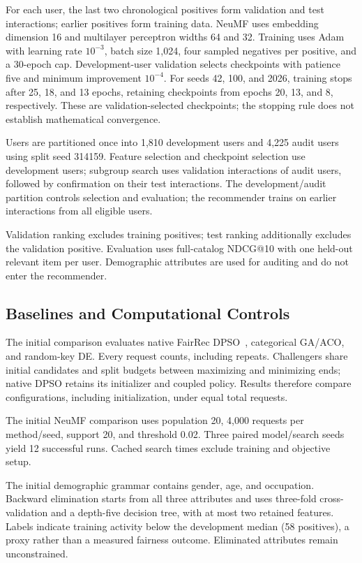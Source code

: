 \documentclass[sigconf,nonacm]{acmart}
\begin{document}
For each user, the last two chronological positives form validation and test interactions; earlier positives form training data. NeuMF uses embedding dimension 16 and multilayer perceptron widths 64 and 32. Training uses Adam with learning rate $10^{-3}$, batch size 1,024, four sampled negatives per positive, and a 30-epoch cap. Development-user validation selects checkpoints with patience five and minimum improvement $10^{-4}$. For seeds 42, 100, and 2026, training stops after 25, 18, and 13 epochs, retaining checkpoints from epochs 20, 13, and 8, respectively. These are validation-selected checkpoints; the stopping rule does not establish mathematical convergence.

Users are partitioned once into 1,810 development users and 4,225 audit users using split seed 314159. Feature selection and checkpoint selection use development users; subgroup search uses validation interactions of audit users, followed by confirmation on their test interactions. The development/audit partition controls selection and evaluation; the recommender trains on earlier interactions from all eligible users.

Validation ranking excludes training positives; test ranking additionally excludes the validation positive. Evaluation uses full-catalog NDCG@10 with one held-out relevant item per user. Demographic attributes are used for auditing and do not enter the recommender.

\subsection{Baselines and Computational Controls}
The initial comparison evaluates native FairRec DPSO~\cite{guo2023fairrec}, categorical GA/ACO, and random-key DE. Every request counts, including repeats. Challengers share initial candidates and split budgets between maximizing and minimizing ends; native DPSO retains its initializer and coupled policy. Results therefore compare configurations, including initialization, under equal total requests.

The initial NeuMF comparison uses population 20, 4,000 requests per method/seed, support 20, and threshold 0.02. Three paired model/search seeds yield 12 successful runs. Cached search times exclude training and objective setup.

The initial demographic grammar contains gender, age, and occupation. Backward elimination starts from all three attributes and uses three-fold cross-validation and a depth-five decision tree, with at most two retained features. Labels indicate training activity below the development median (58 positives), a proxy rather than a measured fairness outcome. Eliminated attributes remain unconstrained.
\end{document}
